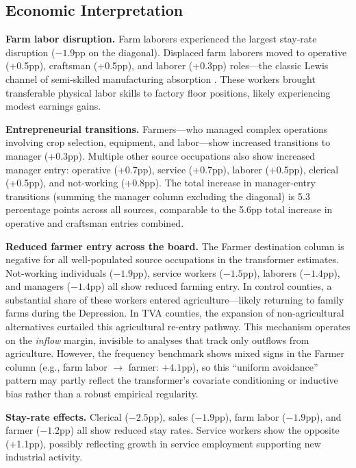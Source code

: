 \documentclass[12pt]{article}
\begin{document}
\subsection{Economic Interpretation}

\textbf{Farm labor disruption.} Farm laborers experienced the largest stay-rate disruption ($-1.9$pp on the diagonal). Displaced farm laborers moved to operative (+0.5pp), craftsman (+0.5pp), and laborer (+0.3pp) roles---the classic Lewis channel of semi-skilled manufacturing absorption \citep{lewis1954}. These workers brought transferable physical labor skills to factory floor positions, likely experiencing modest earnings gains.

\textbf{Entrepreneurial transitions.} Farmers---who managed complex operations involving crop selection, equipment, and labor---show increased transitions to manager (+0.3pp). Multiple other source occupations also show increased manager entry: operative (+0.7pp), service (+0.7pp), laborer (+0.5pp), clerical (+0.5pp), and not-working (+0.8pp). The total increase in manager-entry transitions (summing the manager column excluding the diagonal) is 5.3 percentage points across all sources, comparable to the 5.6pp total increase in operative and craftsman entries combined.

\textbf{Reduced farmer entry across the board.} The Farmer destination column is negative for all well-populated source occupations in the transformer estimates. Not-working individuals ($-1.9$pp), service workers ($-1.5$pp), laborers ($-1.4$pp), and managers ($-1.4$pp) all show reduced farming entry. In control counties, a substantial share of these workers entered agriculture---likely returning to family farms during the Depression. In TVA counties, the expansion of non-agricultural alternatives curtailed this agricultural re-entry pathway. This mechanism operates on the \textit{inflow} margin, invisible to analyses that track only outflows from agriculture. However, the frequency benchmark shows mixed signs in the Farmer column (e.g., farm labor $\to$ farmer: $+4.1$pp), so this ``uniform avoidance'' pattern may partly reflect the transformer's covariate conditioning or inductive bias rather than a robust empirical regularity.

\textbf{Stay-rate effects.} Clerical ($-2.5$pp), sales ($-1.9$pp), farm labor ($-1.9$pp), and farmer ($-1.2$pp) all show reduced stay rates. Service workers show the opposite (+1.1pp), possibly reflecting growth in service employment supporting new industrial activity.
\end{document}
